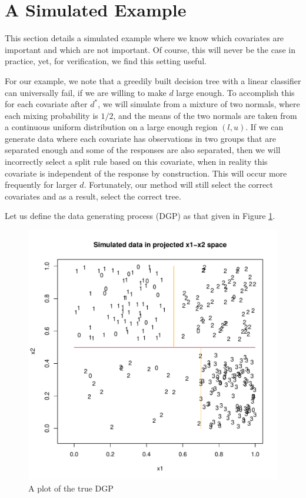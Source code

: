 \section{A Simulated Example}\label{sec:ase}

This section details a simulated example where we know which covariates are important and which are not important. Of course, this will never be the case in practice, yet, for verification, we find this setting useful. 

For our example, we note that a greedily built decision tree with a linear classifier can universally fail, if we are willing to make $d$ large enough. To accomplish this for each covariate after $d^*$, we will simulate from a mixture of two normals, where each mixing probability is $1/2$, and the means of the two normals are taken from a continuous uniform distribution on a large enough region $(l,u)$. If we can generate data where each covariate has observations in two groups that are separated enough and some of the responses are also separated, then we will incorrectly select a split rule based on this covariate, when in reality this covariate is independent of the response by construction. This will occur more frequently for larger $d$. Fortunately, our method will still select the correct covariates and as a result, select the correct tree.   

 Let us define the data generating process (DGP) as that given in Figure \ref{fig:awesome_image2}.  

\begin{figure}[h]
\centering
\label{fig:3fig_tree}
  \includegraphics[scale=0.4]{figures/proj_plot.pdf}
  \caption{A plot of the true DGP}\label{fig:awesome_image2}
\end{figure}

